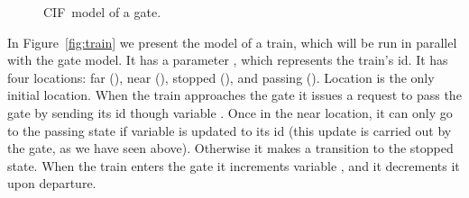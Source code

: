 \documentclass[submission,copyright,creativecommons,sharealike]{eptcs}
\newcommand{\CIF}{{CIF}}
\begin{document}
\begin{figure}[htb]
  \centering
  \caption{\CIF\ model of a gate.}
  \label{fig:gate}
\end{figure}

In Figure~\ref{fig:train} we present the model of a train, which will
be run in parallel with the gate model. It has a parameter , which
represents the train's id. It has four locations: far (),
near (), stopped (), and passing (). Location  is the only
initial location. When the train approaches the gate it issues a
request to pass the gate by sending its id though variable . Once
in the near location, it can only go to the passing state if variable
 is updated to its id (this update is carried out by the gate,
as we have seen above). Otherwise it makes a transition to the
stopped state. When the train enters the gate it increments variable
, and it decrements it upon departure.
\end{document}

